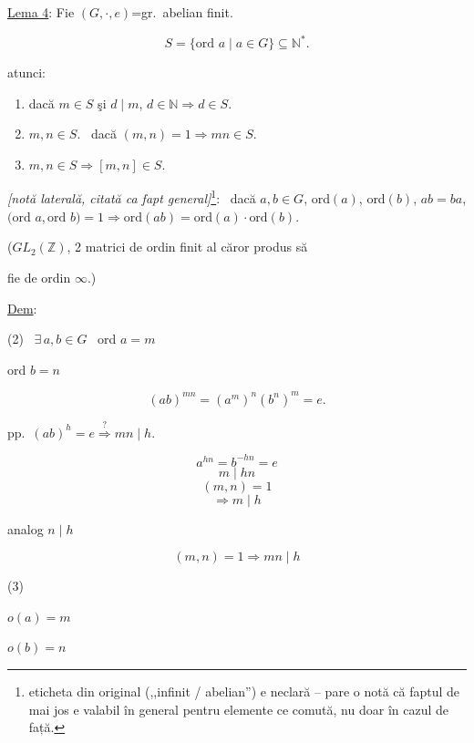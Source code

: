 \noindent\underline{Lema 4}: Fie $(G,\cdot,e)$=gr.\ abelian finit.

\[
S=\{\text{ord } a \mid a\in G\} \subseteq \mathbb{N}^*.
\]

\bigskip
\noindent atunci:

\begin{enumerate}
\item[(1)] dacă $m\in S$ şi $d\mid m$, $d\in\mathbb{N} \Rightarrow d\in S$.
\item[(2)] $m,n\in S$. \ dacă $(m,n)=1 \Rightarrow mn\in S$.
\item[(3)] $m,n\in S \Rightarrow [m,n]\in S$.
\end{enumerate}

\bigskip
\noindent\textit{[notă laterală, citată ca fapt general]}\footnote{eticheta din original (,,infinit / abelian'') e neclară -- pare o notă că faptul de mai jos e valabil în general pentru elemente ce comută, nu doar în cazul de față.}: \ dacă $a,b\in G$, ord$(a)$, ord$(b)$, $ab=ba$, $\big(\text{ord } a,\text{ord } b\big)=1 \Rightarrow \text{ord}(ab)=\text{ord}(a)\cdot\text{ord}(b)$.

\bigskip
\noindent\big($GL_2(\mathbb{Z})$, 2 matrici de ordin finit al căror produs să

\noindent fie de ordin $\infty$.\big)

\bigskip
\noindent\underline{Dem}:

\bigskip
\noindent (2) \ $\exists\, a,b\in G$ \ ord $a=m$

\noindent ord $b=n$

\[
(ab)^{mn} = (a^m)^n(b^n)^m = e.
\]

\noindent pp.\ $(ab)^h=e \overset{?}{\Longrightarrow} mn\mid h$.

\[
a^{hn}=b^{-hn}=e
\]
\[
m\mid hn
\]
\[
(m,n)=1
\]
\[
\Rightarrow m\mid h
\]

\noindent analog $n\mid h$

\[
(m,n)=1 \Rightarrow mn\mid h
\]

\bigskip
\noindent (3)

\noindent $o(a)=m$

\noindent $o(b)=n$
